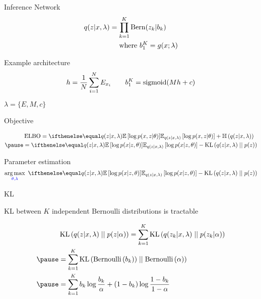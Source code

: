 \begin{frame}{Inference Network}
\begin{equation*}
\begin{aligned}
	q(z|x, \lambda) &= \prod_{k=1}^K \operatorname{Bern}(z_k|b_k) \\
	&\quad~\text{where }b_1^K = g(x; \lambda)
\end{aligned}
\end{equation*}

Example architecture 
\begin{equation*}
\begin{aligned}
h = \frac{1}{N} \sum_{i=1}^N E_{x_i} \qquad b_1^K = \operatorname{sigmoid}( M h + c)
\end{aligned}
\end{equation*}

$\lambda = \{E, M, c\}$

\end{frame}



\begin{frame}{Objective}

\begin{equation*}
\begin{aligned}
&\ELBO = \E[q(z|x, \lambda)]{\log p(x,z|\theta)} + \Ent{q(z|x, \lambda)} \\ \pause
&= \E[q(z|x, \lambda)]{\log p(x|z, \theta)} - \KL{q(z|x, \lambda)}{p(z)}
\end{aligned}
\end{equation*}

\pause

Parameter estimation
\begin{equation*}
\argmax_{\textcolor{blue}{\theta,\lambda}} ~ \E[q(z|x,\lambda)]{\log p(x|z,\theta)} - \KL{q(z|x,\lambda)}{p(z)}
\end{equation*}


\end{frame}

\begin{frame}{KL}

KL between $K$ independent Bernoulli distributions is tractable

\begin{equation*}
\begin{aligned}
	&\KL{q(z|x, \lambda)}{p(z|\alpha)}  = \sum_{k=1}^K \KL{q(z_k|x, \lambda)}{p(z_k|\alpha)} \\ \pause
	&= \sum_{k=1}^K \KL{\BerDist{b_k})}{\BerDist{\alpha}} \\ \pause
	&=  \sum_{k=1}^K b_k \log \frac{b_k}{\alpha} + (1 - b_k) \log \frac{1 - b_k}{1 - \alpha}
\end{aligned}
\end{equation*}

\end{frame}

